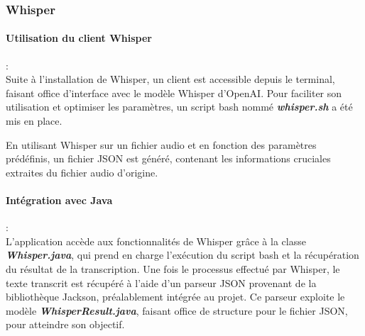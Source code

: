 \subsubsection{Whisper}
\label{sec:whisperImpl}

\paragraph*{Utilisation du client Whisper} : \\

Suite à l'installation de Whisper, un client est accessible depuis le terminal, faisant office d'interface avec le modèle Whisper d'OpenAI. 
Pour faciliter son utilisation et optimiser les paramètres, un script bash nommé \textbf{\textit{whisper.sh}} a été mis en place.

En utilisant Whisper sur un fichier audio et en fonction des paramètres prédéfinis, un fichier JSON est généré, contenant les informations cruciales extraites du fichier audio d'origine.

\paragraph*{Intégration avec Java} : \\

L'application accède aux fonctionnalités de Whisper grâce à la classe \textbf{\textit{Whisper.java}}, qui prend en charge l'exécution du script bash et la récupération du résultat de la transcription. 
Une fois le processus effectué par Whisper, le texte transcrit est récupéré à l'aide d'un parseur JSON provenant de la bibliothèque Jackson, préalablement intégrée au projet. 
Ce parseur exploite le modèle \textbf{\textit{WhisperResult.java}}, faisant office de structure pour le fichier JSON, pour atteindre son objectif.